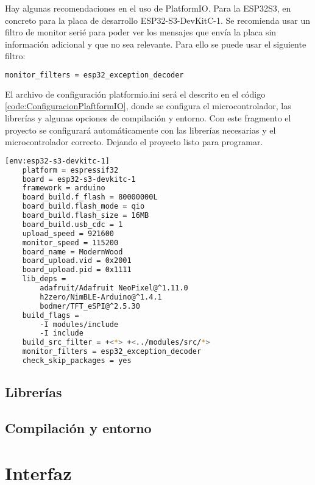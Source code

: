 Hay algunas recomendaciones en el uso de PlatformIO. Para la ESP32S3, en concreto para la placa de desarrollo ESP32-S3-DevKitC-1. Se recomienda usar un filtro de monitor serié para poder ver los mensajes que envía la placa sin información adicional y que no sea relevante. Para ello se puede usar el siguiente filtro:

\begin{lstlisting}[style=console, language=bash, caption={Filtro recomendado de PlatformIO}, label={code:FiltroEspecial}]
monitor_filters = esp32_exception_decoder
\end{lstlisting}

El archivo de configuración platformio.ini será el descrito en el código \ref{code:ConfiguracionPlaftformIO}, donde se configura el microcontrolador, las librerías y algunas opciones de compilación y entorno. Con este fragmento el proyecto se configurará automáticamente con las librerías necesarias y el microcontrolador correcto. Dejando el proyecto listo para programar.

\begin{lstlisting}[style=console, language=bash, caption={Configuracion PlatformIO}, label={code:ConfiguracionPlaftformIO}]
    [env:esp32-s3-devkitc-1]
    platform = espressif32
    board = esp32-s3-devkitc-1
    framework = arduino
    board_build.f_flash = 80000000L
    board_build.flash_mode = qio
    board_build.flash_size = 16MB
    board_build.usb_cdc = 1
    upload_speed = 921600
    monitor_speed = 115200
    board_name = ModernWood
    board_upload.vid = 0x2001
    board_upload.pid = 0x1111
    lib_deps = 
        adafruit/Adafruit NeoPixel@^1.11.0
        h2zero/NimBLE-Arduino@^1.4.1
        bodmer/TFT_eSPI@^2.5.30
    build_flags =
        -I modules/include
        -I include
    build_src_filter = +<*> +<../modules/src/*>
    monitor_filters = esp32_exception_decoder
    check_skip_packages = yes
\end{lstlisting}

\subsection{Librerías}
\subsection{Compilación y entorno}

\section{Interfaz}
